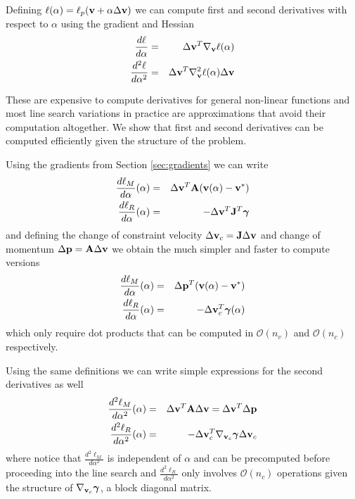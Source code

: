 Defining $\ell(\alpha) = \ell_p({\mathbf{v}}+\alpha\Delta{\mathbf{v}})$ we can
compute first and second derivatives with respect to $\alpha$ using the gradient
and Hessian
\begin{eqnarray}
	\frac{d\ell}{d\alpha}&=&\Delta{\mathbf{v}}^T\nabla_{\mathbf{v}}\ell(\alpha)\nonumber\\
	\frac{d^2\ell}{d\alpha^2}&=&\Delta{\mathbf{v}}^T\nabla_{\mathbf{v}}^2\ell(\alpha)\Delta{\mathbf{v}}\nonumber
\end{eqnarray}

These are expensive to compute derivatives for general non-linear functions and
most line search variations in practice are approximations that avoid their
computation altogether. We show that first and second derivatives can be
computed efficiently given the structure of the problem.

Using the gradients from Section \ref{sec:gradients} we can write
\begin{eqnarray}
	\frac{d\ell_M}{d\alpha}(\alpha)&=&\Delta{\mathbf{v}}^T{\mathbf{A}}({\mathbf{v}}(\alpha)-{\mathbf{v}}^*)\\
	\frac{d\ell_R}{d\alpha}(\alpha)&=&-\Delta{\mathbf{v}}^T{\mathbf{J}}^T{\bm\gamma}
\end{eqnarray}
and defining the change of constraint velocity
$\Delta{\mathbf{v}}_c={\mathbf{J}}\Delta{\mathbf{v}}$ and change of momentum $\Delta{\mathbf{p}} =
{\mathbf{A}}\Delta{\mathbf{v}}$ we obtain the much simpler and faster to compute versions
\begin{eqnarray}
	\frac{d\ell_M}{d\alpha}(\alpha)&=&\Delta{\mathbf{p}}^T({\mathbf{v}}(\alpha)-{\mathbf{v}}^*)\\
	\frac{d\ell_R}{d\alpha}(\alpha)&=&-\Delta{\mathbf{v}}_c^T{\bm\gamma}(\alpha)
\end{eqnarray}
which only require dot products that can be computed in $\mathcal{O}(n_v)$ and
$\mathcal{O}(n_c)$ respectively.

Using the same definitions we can write simple expressions for the second
derivatives as well
\begin{eqnarray}
	\frac{d^2\ell_M}{d\alpha^2}(\alpha)&=&\Delta{\mathbf{v}}^T{\mathbf{A}}\Delta{\mathbf{v}}=\Delta{\mathbf{v}}^T\Delta{\mathbf{p}}\\
	\frac{d^2\ell_R}{d\alpha^2}(\alpha)&=&-\Delta{\mathbf{v}}_c^T
	\nabla_{{\mathbf{v}}_c}{\bm\gamma}\Delta{\mathbf{v}}_c
\end{eqnarray}
where notice that $\frac{d^2\ell_M}{d\alpha^2}$ is independent of $\alpha$ and
can be precomputed before proceeding into the line search and
$\frac{d^2\ell_R}{d\alpha^2}$ only involves $\mathcal{O}(n_c)$ operations given
the structure of $\nabla_{{\mathbf{v}}_c}{\bm\gamma}$, a block diagonal matrix.


